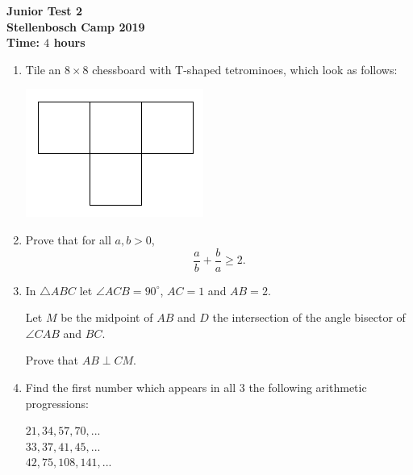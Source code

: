 \documentclass{article}
\begin{document}
\thispagestyle{empty}

\begin{center}
  \textbf{\Large Junior Test 2}
  \\ \vspace{1em}
  \textbf{\large Stellenbosch Camp 2019}
  \\ \vspace{1em}
  \textbf{\large Time: $4$ hours}
\end{center}

\vspace{18pt}
\begin{enumerate}[1.]

\item %
Tile an $8 \times 8$ chessboard with T-shaped tetrominoes, which look as follows:
\begin{center}
	\includegraphics[scale=0.3]{test_2_q_1.png}
\end{center}


\vspace{18pt}
\item %
Prove that for all $a, b > 0$,
\[ \frac{a}{b} + \frac{b}{a} \geq 2. \]


\vspace{18pt}
\item %
In $\triangle ABC$ let $\angle ACB = 90^\circ$, $AC = 1$ and $AB = 2$.

Let $M$ be the midpoint of $AB$ and $D$ the intersection of the angle bisector of $\angle CAB$ and $BC$.

Prove that $AB \perp CM$.


\vspace{18pt}
\item %
Find the first number which appears in all 3 the following arithmetic progressions:
\begin{center}
	$21, 34, 57, 70,...$\\
	$33, 37, 41, 45,...$\\
	$42, 75, 108, 141,...$
\end{center}



\end{enumerate}
\end{document}
